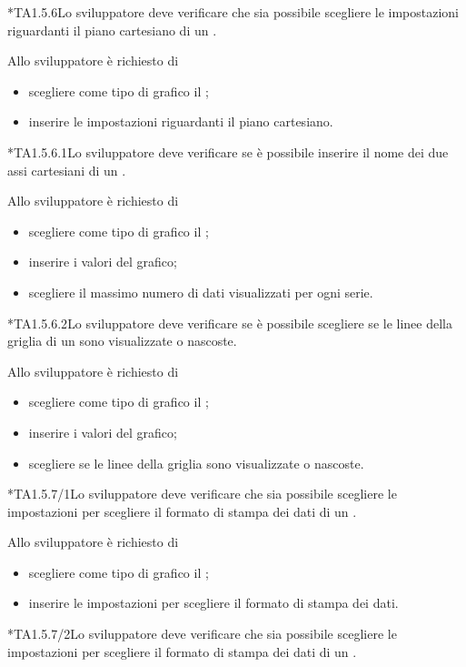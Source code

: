 	*{TA1.5.6}Lo sviluppatore deve verificare che sia possibile scegliere le impostazioni riguardanti il piano cartesiano di un .

		Allo sviluppatore è richiesto di
		\begin{itemize}
			\item scegliere come tipo di grafico il ;
			\item inserire le impostazioni riguardanti il piano cartesiano.
		\end{itemize}

	*{TA1.5.6.1}Lo sviluppatore deve verificare se è possibile inserire il nome dei due assi cartesiani di un .

		Allo sviluppatore è richiesto di
		\begin{itemize}
			\item scegliere come tipo di grafico il ;
			\item inserire i valori del grafico;
			\item scegliere il massimo numero di dati visualizzati per ogni serie.
		\end{itemize}

	*{TA1.5.6.2}Lo sviluppatore deve verificare se è possibile scegliere se le linee della griglia di un  sono visualizzate o nascoste.

		Allo sviluppatore è richiesto di
		\begin{itemize}
			\item scegliere come tipo di grafico il ;
			\item inserire i valori del grafico;
			\item scegliere se le linee della griglia sono visualizzate o nascoste.
		\end{itemize}

	*{TA1.5.7/1}Lo sviluppatore deve verificare che sia possibile scegliere le impostazioni per scegliere il formato di stampa dei dati di un .

		Allo sviluppatore è richiesto di
		\begin{itemize}
			\item scegliere come tipo di grafico il ;
			\item inserire le impostazioni per scegliere il formato di stampa dei dati.
		\end{itemize}

	*{TA1.5.7/2}Lo sviluppatore deve verificare che sia possibile scegliere le impostazioni per scegliere il formato di stampa dei dati di un .

